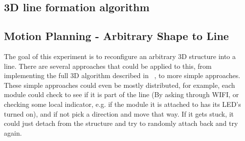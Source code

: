 \subsection{3D line formation algorithm}
\label{sec:algLine}
\subsection{Motion Planning - Arbitrary Shape to Line}
\label{ssec:line}
The goal of this experiment is to reconfigure an arbitrary 3D structure into a line. There are several approaches that could be applied to this, from implementing the full 3D algorithm described in ~\cite{sung2015reconfiguration}, to more simple approaches. These simple approaches could even be mostly distributed, for example, each module could check to see if it is part of the line (By asking through WIFI, or checking some local indicator, e.g. if the module it is attached to has its LED's turned on), and if not pick a direction and move that way. If it gets stuck, it could just detach from the structure and try to randomly attach back and try again.

